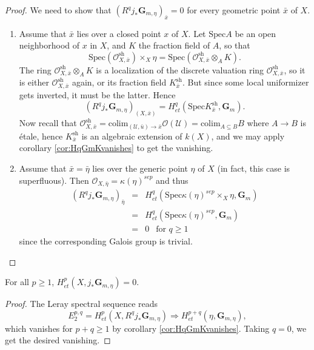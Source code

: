 \begin{proof}
We need to show that $(R^q j_*\mathbf{G}_{m,\eta})_{\bar x} = 0$ for every 
geometric point $\bar x$ of $X$. 
\begin{enumerate}
\item
Assume that $\bar x$ lies over a closed point $x$ of $X$. Let $\text{Spec} A$ 
be an open neighborhood of $x$ in $X$, and $K$ the fraction field of $A$, so 
that
$$
\text{Spec}(\mathcal{O}^\text{sh}_{X,\bar x}) \times_X \eta = 
\text{Spec}(\mathcal{O}^\text{sh}_{X,\bar x} \otimes_A K).
$$
The ring $\mathcal{O}^\text{sh}_{X,\bar x} \otimes_A K$ is a localization of 
the discrete valuation ring $\mathcal{O}^\text{sh}_{X,\bar x}$, so it is either 
$\mathcal{O}^\text{sh}_{X,\bar x}$ again, or its fraction field 
$K^\text{sh}_{\bar x}$. But since some local uniformizer gets inverted, it must 
be the latter. Hence
$$
(R^q j_*\mathbf{G}_{m,\eta})_{(X, \bar x)} = H_{et}^q(\text{Spec} 
K^\text{sh}_{\bar x}, \mathbf{G}_m).
$$
Now recall that $\mathcal{O}^\text{sh}_{X, \bar x} = 
\text{colim}_{(\mathcal{U},\bar u) \to \bar x} \mathcal{O} (\mathcal{U}) = 
\text{colim}_{A \subseteq B} B$ where $A \to B$ is \'etale, hence 
$K^\text{sh}_{\bar x}$ is an algebraic extension of $k(X)$, and we may apply 
corollary \ref{cor:HqGmKvanishes} to get the vanishing.
\item
Assume that $\bar x = \bar \eta$ lies over the generic point $\eta$ of $X$ (in 
fact, this case is superfluous). Then $\mathcal{O}_{X,\bar \eta} = 
\kappa(\eta)^{sep}$ and thus
\begin{eqnarray*}
(R^q j_*\mathbf{G}_{m,\eta})_{\bar \eta}
& = &
H_{et}^q(\text{Spec} \kappa(\eta)^{sep} \times_X \eta, \mathbf{G}_m) \\
& = & H_{et}^q (\text{Spec} \kappa(\eta)^{sep}, \mathbf{G}_m)  \\
& = & 0 \ \ \text{ for } q \geq 1
\end{eqnarray*}
since the corresponding Galois group is trivial.
\end{enumerate}
\end{proof}

\begin{lemma}
For all $p \geq 1$, $H_{et}^p(X, j_*\mathbf{G}_{m,\eta}) = 0$.
\end{lemma}

\begin{proof}
The Leray spectral sequence reads
$$
E_2^{p,q} = H_{et}^p(X, R^qj_*\mathbf{G}_{m,\eta}) \Rightarrow 
H_{et}^{p+q}(\eta, \mathbf{G}_{m,\eta}),
$$
which vanishes for $p+q \geq 1$ by corollary \ref{cor:HqGmKvanishes}. Taking $q 
= 0$, we get the desired vanishing.
\end{proof}

